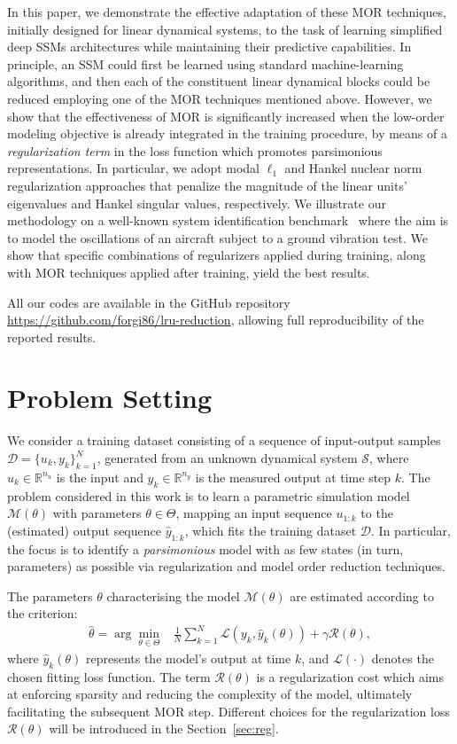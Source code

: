 \documentclass{article} %
\newcommand{\R}{\mathbb{R}}
\newcommand{\regpar}{\gamma}
\newcommand{\regfun}{\mathcal{R}}
\newcommand{\ny}{{n_y}}
\newcommand{\nin}{{n_u}}
\begin{document}
In this paper, we demonstrate the effective adaptation of these MOR techniques, initially designed for linear dynamical systems, to the task of learning simplified deep SSMs architectures while maintaining their predictive capabilities. In principle, an SSM could  first be learned using standard machine-learning algorithms, and then each of the constituent linear dynamical blocks could be reduced employing one of the MOR techniques mentioned above.
However, we show that the effectiveness of MOR is significantly increased when the low-order modeling objective is already integrated in the training procedure, by means of a \emph{regularization term} in the loss function which promotes parsimonious representations.
In particular, we adopt modal $\ell_1$ and Hankel nuclear norm regularization approaches that penalize the magnitude of the linear units' eigenvalues and Hankel singular values, respectively.
We illustrate our methodology on a well-known system identification benchmark~\cite{noel2017f} where the aim is to model the oscillations of an aircraft subject to a ground vibration test. We show that specific combinations of regularizers applied during training, along with  MOR techniques applied after training, yield the best results.

{All our codes are available in the GitHub repository \url{https://github.com/forgi86/lru-reduction}, allowing full reproducibility of the reported results.}

\section{Problem Setting}\label{sec:problem}

We consider a training dataset consisting of a sequence of input-output samples $\mathcal{D}= \{u_k, y_k \}_{k=1}^{N}$, generated from an unknown dynamical system $\mathcal{S}$, where $u_k \in \R^{\nin}$ is the input and $y_k \in \R^{\ny}$ is the measured output at time step $k$.
The problem considered in this work is to learn 
 a parametric simulation model $\mathcal{M}(\theta)$ with parameters $\theta \in \Theta$, mapping an input sequence $u_{1:k}$ to the (estimated) output sequence $\hat{y}_{1:k}$, which fits the training dataset $\mathcal{D}$. In particular, the focus is  to identify a \emph{parsimonious} model with as few states (in turn, parameters) as possible  via regularization and model order reduction techniques.

The parameters  $\theta$  characterising the model $\mathcal{M}(\theta)$ are estimated according to the criterion:
\begin{align}
\hat{\theta} =  \arg\min_{\theta \in \Theta}  & \frac{1}{N}\sum_{k=1}^N \mathcal{L}\left(y_k, \hat{y}_k(\theta) \right) +  \regpar \regfun(\theta),    \label{eqn:lossE}
\end{align}
where $\hat{y}_k(\theta)$ represents the model's output at time $k$, and $\mathcal{L}(\cdot)$ denotes the chosen fitting loss function. The term $\regfun(\theta)$ is a regularization cost which aims at enforcing sparsity and reducing the complexity of the model, ultimately facilitating the subsequent MOR step. Different choices for the regularization loss $\regfun(\theta)$ will be introduced in the Section~\ref{sec:reg}.
\end{document}
